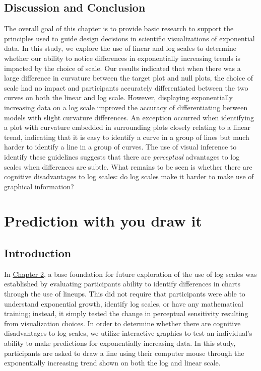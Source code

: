 \documentclass[print]{nuthesis}
\begin{document}
\hypertarget{discussion-and-conclusion}{%
\section{Discussion and Conclusion}\label{discussion-and-conclusion}}

The overall goal of this chapter is to provide basic research to support the principles used to guide design decisions in scientific visualizations of exponential data.
In this study, we explore the use of linear and log scales to determine whether our ability to notice differences in exponentially increasing trends is impacted by the choice of scale.
Our results indicated that when there was a large difference in curvature between the target plot and null plots, the choice of scale had no impact and participants accurately differentiated between the two curves on both the linear and log scale.
However, displaying exponentially increasing data on a log scale improved the accuracy of differentiating between models with slight curvature differences.
An exception occurred when identifying a plot with curvature embedded in surrounding plots closely relating to a linear trend, indicating that it is easy to identify a curve in a group of lines but much harder to identify a line in a group of curves.
The use of visual inference to identify these guidelines suggests that there are \emph{perceptual} advantages to log scales when differences are subtle.
What remains to be seen is whether there are cognitive disadvantages to log scales: do log scales make it harder to make use of graphical information?

\hypertarget{youdrawit}{%
\chapter{Prediction with you draw it}\label{youdrawit}}

\hypertarget{introduction-1}{%
\section{Introduction}\label{introduction-1}}

In \protect\hyperlink{lineups}{Chapter 2}, a base foundation for future exploration of the use of log scales was established by evaluating participants ability to identify differences in charts through the use of lineups.
This did not require that participants were able to understand exponential growth, identify log scales, or have any mathematical training; instead, it simply tested the change in perceptual sensitivity resulting from visualization choices.
In order to determine whether there are cognitive disadvantages to log scales, we utilize interactive graphics to test an individual's ability to make predictions for exponentially increasing data. In this study, participants are asked to draw a line using their computer mouse through the exponentially increasing trend shown on both the log and linear scale.
\end{document}
